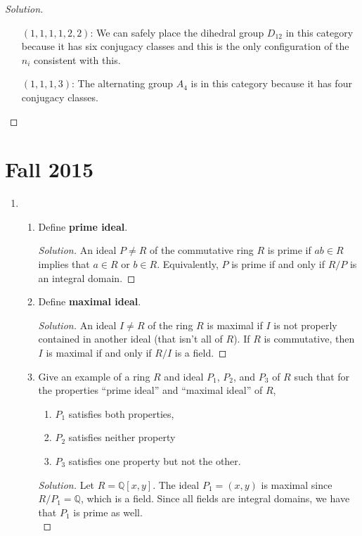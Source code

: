 \documentclass[11pt,letterpaper]{report}
\newcommand{\rationals}{\mathbb{Q}}
\newenvironment{solution}
{\begin{proof}[Solution]}
{\end{proof}}
\begin{document}
\begin{enumerate}
\begin{solution}
\begin{itemize}
			\item[$(1, 1, 1, 1, 2, 2)$:] We can safely place the dihedral group $D_{12}$ in this category because it has six conjugacy classes and this is the only configuration of the $n_i$ consistent with this.

			\item[$(1, 1, 1, 3)$:] The alternating group $A_4$ is in this category because it has four conjugacy classes.
		\end{itemize}
	\end{solution}
\end{enumerate}

\section*{Fall 2015}
\begin{enumerate}
	\item \begin{enumerate}
		\item Define \textbf{prime ideal}.
		\begin{solution}
			An ideal $P\neq R$ of the commutative ring $R$ is prime if $ab\in R$ implies that $a\in R$ or $b\in R$. Equivalently, $P$ is prime if and only if $R/P$ is an integral domain.
		\end{solution}
		\item Define \textbf{maximal ideal}.
		\begin{solution}
			An ideal $I\neq R$ of the ring $R$ is maximal if $I$ is not properly contained in another ideal (that isn't all of $R$). If $R$ is commutative, then $I$ is maximal if and only if $R/I$ is a field.
		\end{solution}
		\item Give an example of a ring $R$ and ideal $P_1$, $P_2$, and $P_3$ of $R$ such that for the properties ``prime ideal'' and ``maximal ideal'' of $R$,
		\begin{enumerate}
			\item $P_1$ satisfies both properties,
			\item $P_2$ satisfies neither property
			\item $P_3$ satisfies one property but not the other.
		\end{enumerate}
		\begin{solution}
			Let $R = \rationals[x,y]$. The ideal $P_1 = (x,y)$ is maximal since $R/P_1 = \rationals$, which is a field. Since all fields are integral domains, we have that $P_1$ is prime as well.\\


\end{solution}
\end{enumerate}
\end{enumerate}
\end{document}

